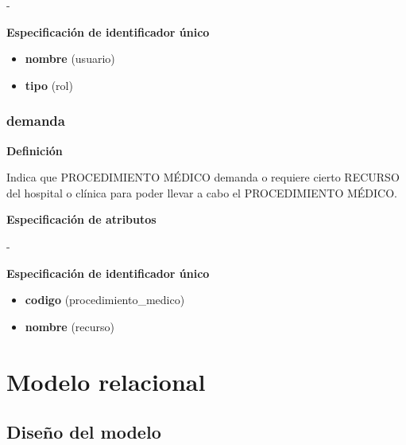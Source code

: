 \documentclass[a4paper,11pt]{article}
\begin{document}
-

\textbf{Especificación de identificador único}

\begin{itemize}

     \item \textbf{nombre} (usuario)

     \item \textbf{tipo} (rol)

\end{itemize}

\subsubsection{\textbf{demanda}}

\textbf{Definición}

Indica que PROCEDIMIENTO MÉDICO demanda o requiere cierto RECURSO del hospital o clínica
para poder llevar a cabo el PROCEDIMIENTO MÉDICO.

\textbf{Especificación de atributos}

-

\textbf{Especificación de identificador único}

\begin{itemize}

     \item \textbf{codigo} (procedimiento\_medico)

     \item \textbf{nombre} (recurso)

\end{itemize}



\section{\textbf{Modelo relacional\label{HToc293405831}}}

\subsection{\textbf{Diseño del modelo\label{HToc293405832}}}
\end{document}
